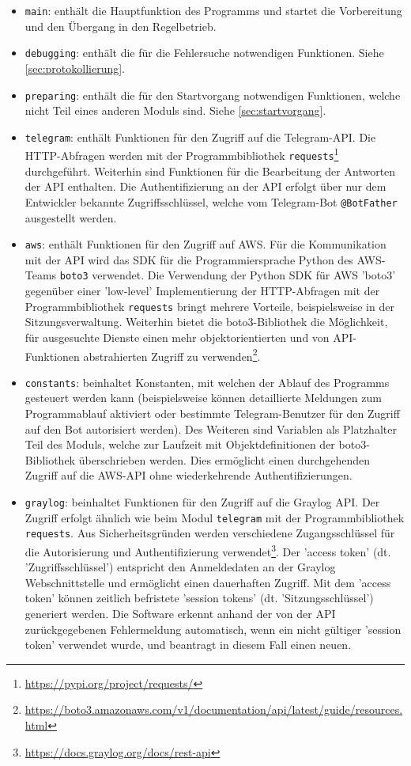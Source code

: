 \begin{itemize}
\item \lstinline{main}: enthält die Hauptfunktion des Programms und startet die Vorbereitung und den Übergang in den Regelbetrieb.
\item \lstinline{debugging}: enthält die für die Fehlersuche notwendigen Funktionen. Siehe \autoref{sec:protokollierung}.
\item \lstinline{preparing}: enthält die für den Startvorgang notwendigen Funktionen, welche nicht Teil eines anderen Moduls sind. Siehe \autoref{sec:startvorgang}.
\item \lstinline{telegram}: enthält Funktionen für den Zugriff auf die Telegram-API. Die HTTP-Abfragen werden mit der Programmbibliothek \lstinline{requests}\footnote{\url{https://pypi.org/project/requests/}} durchgeführt. Weiterhin sind Funktionen für die Bearbeitung der Antworten der API enthalten. Die Authentifizierung an der API erfolgt über nur dem Entwickler bekannte Zugriffsschlüssel, welche vom Telegram-Bot \lstinline{@BotFather} ausgestellt werden.
\item \lstinline{aws}: enthält Funktionen für den Zugriff auf AWS. Für die Kommunikation mit der API wird das SDK für die Programmiersprache Python des AWS-Teams \lstinline{boto3} verwendet. Die Verwendung der Python SDK für AWS 'boto3' gegenüber einer 'low-level' Implementierung der HTTP-Abfragen mit der Programmbibliothek \lstinline{requests} bringt mehrere Vorteile, beispielsweise in der Sitzungsverwaltung. Weiterhin bietet die boto3-Bibliothek die Möglichkeit, für ausgesuchte Dienste einen mehr objektorientierten und von API-Funktionen abstrahierten Zugriff zu verwenden\footnote{\url{https://boto3.amazonaws.com/v1/documentation/api/latest/guide/resources.html}}.
\item \lstinline{constants}: beinhaltet Konstanten, mit welchen der Ablauf des Programms gesteuert werden kann (beispielsweise können detaillierte Meldungen zum Programmablauf aktiviert oder bestimmte Telegram-Benutzer für den Zugriff auf den Bot autorisiert werden). Des Weiteren sind Variablen als Platzhalter Teil des Moduls, welche zur Laufzeit mit Objektdefinitionen der boto3-Bibliothek überschrieben werden. Dies ermöglicht einen durchgehenden Zugriff auf die AWS-API ohne wiederkehrende Authentifizierungen.
\item \lstinline{graylog}: beinhaltet Funktionen für den Zugriff auf die Graylog API. Der Zugriff erfolgt ähnlich wie beim Modul \lstinline{telegram} mit der Programmbibliothek \lstinline{requests}. Aus Sicherheitsgründen werden verschiedene Zugangsschlüssel für die Autorisierung und Authentifizierung verwendet\footnote{\url{https://docs.graylog.org/docs/rest-api}}. Der 'access token' (dt. 'Zugriffsschlüssel') entspricht den Anmeldedaten an der Graylog Webschnittstelle und ermöglicht einen dauerhaften Zugriff. Mit dem 'access token' können zeitlich befristete 'session tokens' (dt. 'Sitzungsschlüssel') generiert werden. Die Software erkennt anhand der von der API zurückgegebenen Fehlermeldung automatisch, wenn ein nicht gültiger 'session token' verwendet wurde, und beantragt in diesem Fall einen neuen.

\end{itemize}
